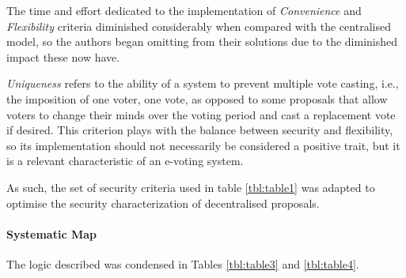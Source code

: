 \documentclass[../access.tex]{subfiles}
\begin{document}
        The time and effort dedicated to the implementation of \textit{Convenience} and \textit{Flexibility} criteria diminished considerably when compared with the centralised model, so the authors began omitting from their solutions due to the diminished impact these now have.
		\par
        \textit{Uniqueness} refers to the ability of a system to prevent multiple vote casting, i.e., the imposition of one voter, one vote, as opposed to some proposals that allow voters to change their minds over the voting period and cast a replacement vote if desired. This criterion plays with the balance between security and flexibility, so its implementation should not necessarily be considered a positive trait, but it is a relevant characteristic of an e-voting system.
		\par
        As such, the set of security criteria used in table \ref{tbl:table1} was adapted to optimise the security characterization of decentralised proposals.

	\paragraph{Systematic Map}
		The logic described was condensed in Tables \ref{tbl:table3} and \ref{tbl:table4}.
\end{document}

